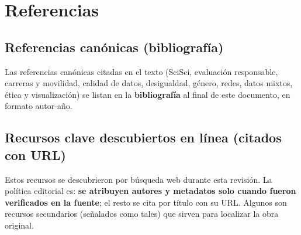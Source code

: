 \section{Referencias}

\subsection{Referencias canónicas (bibliografía)}

Las referencias canónicas citadas en el texto (SciSci, evaluación responsable,
carreras y movilidad, calidad de datos, desigualdad, género, redes, datos
mixtos, ética y visualización) se listan en la \textbf{bibliografía} al final
de este documento, en formato autor-año.

\subsection{Recursos clave descubiertos en línea (citados con URL)}

Estos recursos se descubrieron por búsqueda web durante esta revisión. La
política editorial es: \textbf{se atribuyen autores y metadatos solo cuando
fueron verificados en la fuente}; el resto se cita por título con su URL. Algunos
son recursos secundarios (señalados como tales) que sirven para localizar la
obra original.

